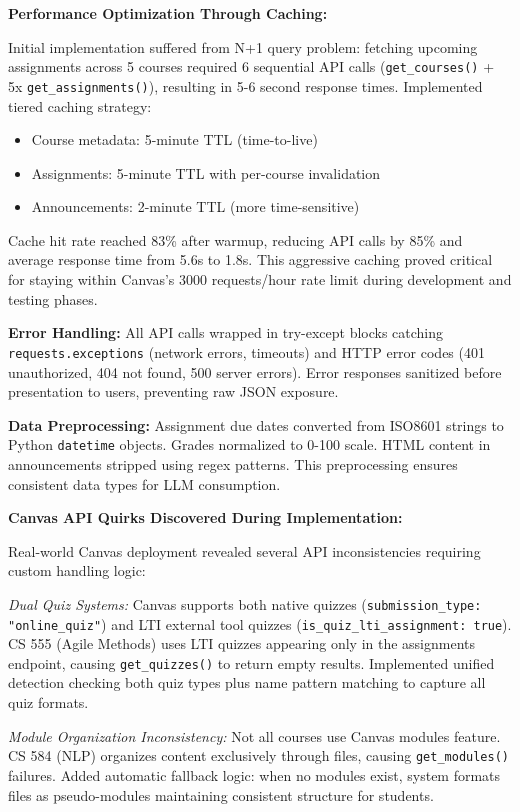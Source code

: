 \documentclass{article}
\begin{document}
\textbf{Performance Optimization Through Caching:}

Initial implementation suffered from N+1 query problem: fetching upcoming assignments across 5 courses required 6 sequential API calls (\texttt{get\_courses()} + 5x \texttt{get\_assignments()}), resulting in 5-6 second response times. Implemented tiered caching strategy:

\begin{itemize}
    \item Course metadata: 5-minute TTL (time-to-live)
    \item Assignments: 5-minute TTL with per-course invalidation
    \item Announcements: 2-minute TTL (more time-sensitive)
\end{itemize}

Cache hit rate reached 83\% after warmup, reducing API calls by 85\% and average response time from 5.6s to 1.8s. This aggressive caching proved critical for staying within Canvas's 3000 requests/hour rate limit during development and testing phases.


\textbf{Error Handling:} All API calls wrapped in try-except blocks catching \texttt{requests.exceptions} (network errors, timeouts) and HTTP error codes (401 unauthorized, 404 not found, 500 server errors). Error responses sanitized before presentation to users, preventing raw JSON exposure.

\textbf{Data Preprocessing:} Assignment due dates converted from ISO8601 strings to Python \texttt{datetime} objects. Grades normalized to 0-100 scale. HTML content in announcements stripped using regex patterns. This preprocessing ensures consistent data types for LLM consumption.

\textbf{Canvas API Quirks Discovered During Implementation:}

Real-world Canvas deployment revealed several API inconsistencies requiring custom handling logic:

\textit{Dual Quiz Systems:} Canvas supports both native quizzes (\texttt{submission\_type: "online\_quiz"}) and LTI external tool quizzes (\texttt{is\_quiz\_lti\_assignment: true}). CS 555 (Agile Methods) uses LTI quizzes appearing only in the assignments endpoint, causing \texttt{get\_quizzes()} to return empty results. Implemented unified detection checking both quiz types plus name pattern matching to capture all quiz formats.

\textit{Module Organization Inconsistency:} Not all courses use Canvas modules feature. CS 584 (NLP) organizes content exclusively through files, causing \texttt{get\_modules()} failures. Added automatic fallback logic: when no modules exist, system formats files as pseudo-modules maintaining consistent structure for students.
\end{document}
